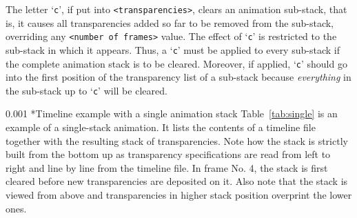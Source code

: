 \documentclass[a4paper]{article}
\makeatletter
\newcommand\myparagraph{\@startsection{paragraph}{3}{\z@}%
                                     {\parskip}%
                                     {0.001\parskip}%
                                     {\itshape\normalsize}}
\makeatother
\begin{document}
The letter `\verb+c+', if put into \verb+<transparencies>+, clears an animation sub-stack, that is, it causes all transparencies added so far to be removed from the sub-stack, overriding any \verb+<number of frames>+ value. The effect of `\verb+c+' is restricted to the sub-stack in which it appears. Thus, a `\verb+c+' must be applied to every sub-stack if the complete animation stack is to be cleared. Moreover, if applied, `\verb+c+' should go into the first position of the transparency list of a sub-stack because \emph{everything} in the sub-stack up to `\verb+c+' will be cleared.


\myparagraph*{Timeline example with a single animation stack}
Table~\ref{tab:single} is an example of a single-stack animation. It lists the contents of a timeline file together with the resulting stack of transparencies. Note how the stack is strictly built from the bottom up as transparency specifications are read from left to right and line by line from the timeline file. In frame No. 4, the stack is first cleared before new transparencies are deposited on it. Also note that the stack is viewed from above and transparencies in higher stack position overprint the lower ones.
\end{document}
